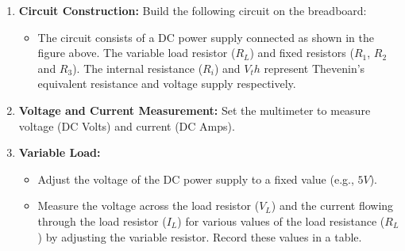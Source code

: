 \begin{enumerate}
    \item \textbf{Circuit Construction:} Build the following circuit on the breadboard:

    \begin{figure}[H]
        \begin{center}
        \end{center}
    \end{figure}

    \begin{itemize}
        \item The circuit consists of a DC power supply connected as shown in the figure above. The variable load resistor ($R_L$) and fixed resistors ($R_1$, $R_2$ and $R_3$). The internal resistance ($R_i$) and $V_th$ represent Thevenin’s equivalent resistance and voltage supply respectively.
    \end{itemize}

    \item \textbf{Voltage and Current Measurement:} Set the multimeter to measure voltage (DC Volts) and current (DC Amps).

    \item \textbf{Variable Load:}

    \begin{itemize}
        \item Adjust the voltage of the DC power supply to a fixed value (e.g., $5V$).
        \item Measure the voltage across the load resistor ($V_L$) and the current flowing through the load resistor ($I_L$) for various values of the load resistance ($R_L$) by adjusting the variable resistor. Record these values in a table.
    \end{itemize}

\end{enumerate}

